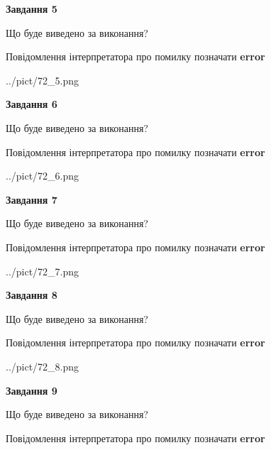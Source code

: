 \documentclass[11pt, ukrainian]{article}
\begin{document}
{\begin {large}
{\begin {center}\textbf{Завдання 5}\end {center}}\par
Що буде виведено за виконання? \par
Повідомлення інтерпретатора про помилку позначати \textbf{error}

\begin{center}
	{../pict/72_5.png}
\end{center}
\newpage

{\begin {center}\textbf{Завдання 6}\end {center}}\par
Що буде виведено за виконання? \par
Повідомлення інтерпретатора про помилку позначати \textbf{error}

\begin{center}
	{../pict/72_6.png}
\end{center}
\newpage

{\begin {center}\textbf{Завдання 7}\end {center}}\par
Що буде виведено за виконання? \par
Повідомлення інтерпретатора про помилку позначати \textbf{error}

\begin{center}
	{../pict/72_7.png}
\end{center}
\newpage

{\begin {center}\textbf{Завдання 8}\end {center}}\par
Що буде виведено за виконання? \par
Повідомлення інтерпретатора про помилку позначати \textbf{error}

\begin{center}
	{../pict/72_8.png}
\end{center}
\newpage

{\begin {center}\textbf{Завдання 9}\end {center}}\par
Що буде виведено за виконання? \par
Повідомлення інтерпретатора про помилку позначати \textbf{error}


\end{large}}
\end{document}

